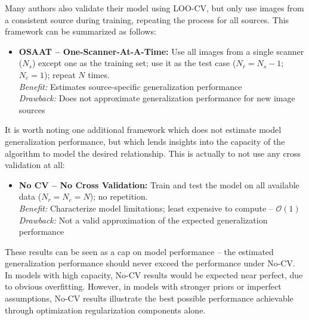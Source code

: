 Many authors also validate their model using LOO-CV,
but only use images from a consistent source during training,
repeating the process for all sources.
This framework can be summarized as follows:
\begin{itemize}
  \item\textbf{OSAAT -- One-Scanner-At-A-Time:}
  Use all images from a single scanner ($N_s$) except one as the training set;
  use it as the test case ($N_r = N_s-1$; $N_e = 1$);
  repeat $N$ times.
  \\\textit{Benefit:} Estimates source-specific generalization performance
  \\\textit{Drawback:} Does not approximate generalization performance for new image sources
\end{itemize}
\par
It is worth noting one additional framework which
does not estimate model generalization performance,
but which lends insights into the capacity of the algorithm
to model the desired relationship.
This is actually to not use any cross validation at all:
\begin{itemize}
  \item\textbf{No CV -- No Cross Validation:}
  Train and test the model on all available data ($N_r = N_e = N$);
  no repetition.
  \\\textit{Benefit:} Characterize model limitations; least expensive to compute -- $\mathcal{O}(1)$
  \\\textit{Drawback:} Not a valid approximation of the expected generalization performance
\end{itemize}
These results can be seen as a cap on model performance
-- the estimated generalization performance should never exceed the performance under No-CV.
In models with high capacity, No-CV results would be expected near perfect,
due to obvious overfitting.
However, in models with stronger priors or imperfect assumptions,
No-CV results illustrate the best possible performance achievable
through optimization regularization components alone.
